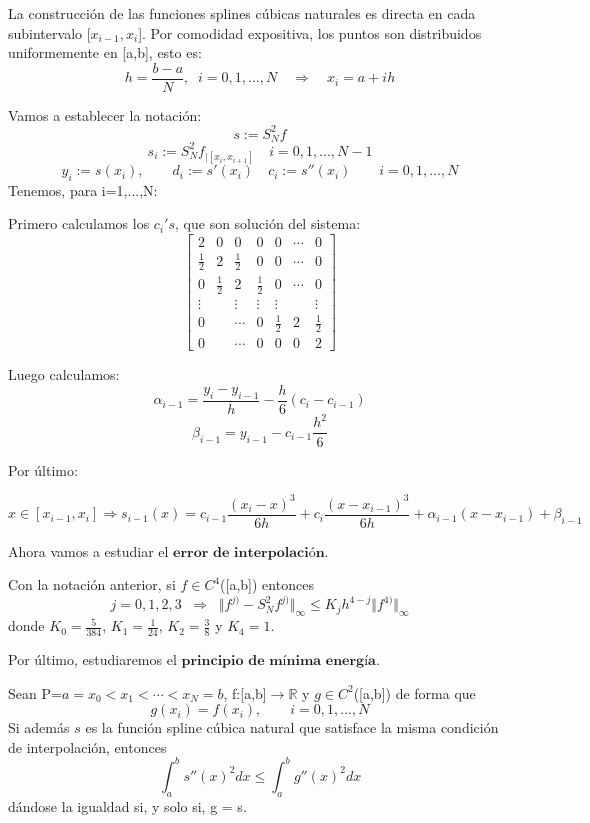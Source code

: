 La construcción de las funciones splines cúbicas naturales es directa en cada subintervalo [$x_{i-1},x_i$]. Por comodidad expositiva, los puntos son distribuidos uniformemente en [a,b], esto es:
\[ h= \frac{b-a}{N}, \; \; i=0,1,...,N \quad \Rightarrow \quad x_i=a+ih \]

Vamos a establecer la notación:
\[ s:= S_N^2f \]
\[ s_i := S_N^2 f_{\vert \left[ x_i, x_{i+1} \right]} \quad i=0,1,...,N-1 \]
\[ y_i:=s(x_i), \qquad d_i:=s'(x_i) \quad c_i:=s''(x_i) \qquad i=0,1,...,N \]
Tenemos, para i=1,...,N:

Primero calculamos los $c_i's$, que son solución del sistema:
\[ \begin{bmatrix}
2 & 0 & 0 & 0 & 0 & \cdots & 0 \\
\frac{1}{2} & 2 & \frac{1}{2} & 0 & 0 & \cdots & 0 \\
0 & \frac{1}{2} & 2 & \frac{1}{2} & 0 & \cdots & 0 \\
\vdots & & \vdots & \vdots & \vdots & & \vdots \\
0 & & \cdots & 0 & \frac{1}{2} & 2 & \frac{1}{2} \\
0 & & \cdots & 0 & 0 & 0 & 2 
\end{bmatrix} \]

Luego calculamos:
\[ \alpha _{i-1} = \frac{y_i - y_{i-1}}{h} - \frac{h}{6} (c_i-c_{i-1}) \]
\[ \beta _{i-1} = y_{i-1} - c_{i-1} \frac{h^2}{6} \]

Por último:

\[ x \in \left[ x_{i-1},x_i \right] \Rightarrow s_{i-1}(x) = c_{i-1} \frac{(x_i-x)^3}{6h}+c_i \frac{(x-x_{i-1})^3}{6h} + \alpha _{i-1} (x-x_{i-1}) + \beta _{i-1} \]

Ahora vamos a estudiar el $\textbf{error de interpolación}$.

\begin{nprop}
Con la notación anterior, si $f \in C^4$([a,b]) entonces
\[ j=0,1,2,3 \; \; \Rightarrow \; \; \Vert f^{j)} - S_N^2f^{j)} \Vert _\infty \leq K_jh^{4-j} \Vert f^{4)} \Vert _\infty \]
donde $K_0=\frac{5}{384}$, $K_1 = \frac{1}{24}$, $K_2 = \frac{3}{8}$ y $K_4 = 1$.
\end{nprop}

Por último, estudiaremos el $\textbf{principio de mínima energía}$.

\begin{nprop}
Sean P={$a=x_0 < x_1 < \cdots < x_N = b$}, f:[a,b]$\longrightarrow \mathbb{R}$ y $g \in C^2$([a,b]) de forma que
\[ g(x_i) = f(x_i), \qquad i =0,1,...,N \]
Si además $s$ es la función spline cúbica natural que satisface la misma condición de interpolación, entonces
\[ \int_a^b s''(x)^2dx \leq \int_a^b g''(x)^2 dx \]
dándose la igualdad si, y solo si, g = s.
\end{nprop}

